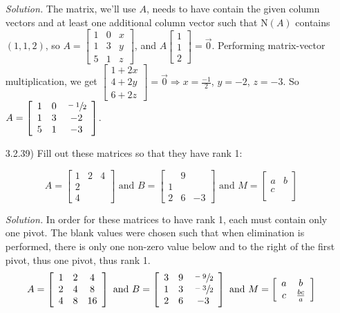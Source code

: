 \documentclass[12pt]{article}
\begin{document}
\begin{itemize}
\textit{Solution.} The matrix, we'll use $A$, needs to have contain the given column vectors and at least one additional column vector such that N$(A)$ contains $(1,1,2)$, so 
$A = \left[\begin{array}{ccc}
1 & 0 & x \\
1 & 3 & y \\
5 & 1 & z
\end{array}\right]$, and 
$A\left[\begin{array}{c}
1 \\
1 \\
2
\end{array}\right] = \vec{0}$. Performing matrix-vector multiplication, we get
$\left[\begin{array}{c}
1+2x \\
4+2y \\
6+2z
\end{array}\right] = \vec{0} \Rightarrow x=\frac{-1}{2}$, $y=-2$, $z=-3$. So
$A=\left[\begin{array}{ccc}
1 & 0 & \sfrac{-1}{2} \\
1 & 3 & -2 \\
5 & 1 & -3
\end{array}\right]$.

\item[3.2.39)] Fill out these matrices so that they have rank 1:

\[A=\left[\begin{array}{ccc}
1 & 2 & 4 \\
2 &   &   \\
4 &   &
\end{array}\right]
\text{  and  }
B=\left[\begin{array}{ccc}
  & 9 &   \\
1 &   &   \\
2 & 6 & -3
\end{array}\right]
\text{  and  }
M=\left[\begin{array}{cc}
a & b \\
c &   \\
\end{array}\right]
\]

\textit{Solution.} In order for these matrices to have rank 1, each must contain only one pivot. The blank values were chosen such that when elimination is performed, there is only one non-zero value below and to the right of the first pivot, thus one pivot, thus rank 1.
\[A=\left[\begin{array}{ccc}
1 & 2 & 4 \\
2 & 4 & 8 \\
4 & 8 & 16
\end{array}\right]
\text{  and  }
B=\left[\begin{array}{ccc}
3 & 9 & \sfrac{-9}{2}  \\
1 & 3 & \sfrac{-3}{2}  \\
2 & 6 & -3
\end{array}\right]
\text{  and  }
M=\left[\begin{array}{cc}
a & b \\
c & \frac{bc}{a} \\
\end{array}\right]
\]


\end{itemize}
\end{document}
